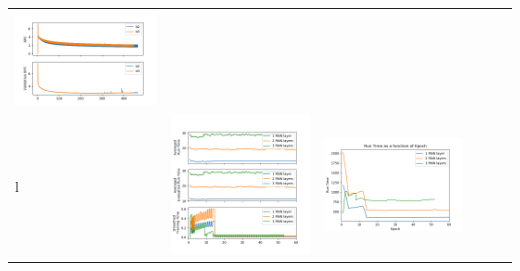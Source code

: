 \begin{longtable}[]{@{}llllll@{}}
\includegraphics{b2_b3_frac_full.png}\tabularnewline
l & \includegraphics{l_time.png} & \includegraphics{l_epoch.png} &

\end{longtable}
